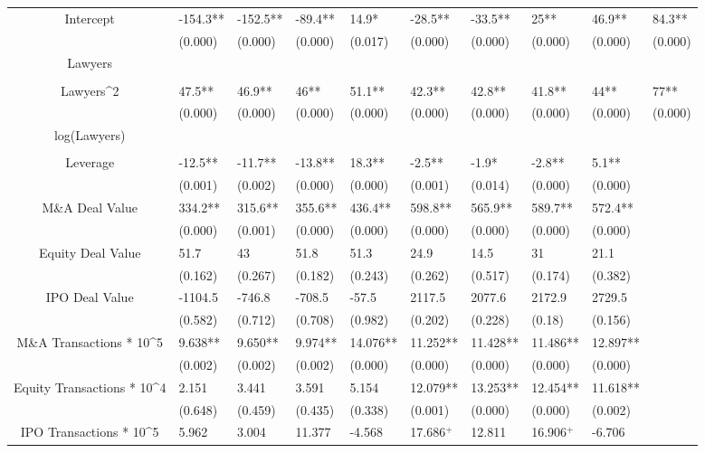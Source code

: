 \documentclass{article}
\begin{document}
\begin{table}[H]
\begin{tabular}{|clllllllll|}
Intercept & -154.3** & -152.5** & -89.4** & 14.9* & -28.5** & -33.5** & 25** & 46.9** & 84.3** \\ 
   & (0.000) & (0.000) & (0.000) & (0.017) & (0.000) & (0.000) & (0.000) & (0.000) & (0.000) \\ 
  Lawyers &  &  &  &  &  &  &  &  &  \\ 
   &  &  &  &  &  &  &  &  &  \\ 
  Lawyers^2 & 47.5** & 46.9** & 46** & 51.1** & 42.3** & 42.8** & 41.8** & 44** & 77** \\ 
   & (0.000) & (0.000) & (0.000) & (0.000) & (0.000) & (0.000) & (0.000) & (0.000) & (0.000) \\ 
  log(Lawyers) &  &  &  &  &  &  &  &  &  \\ 
   &  &  &  &  &  &  &  &  &  \\ 
  Leverage & -12.5** & -11.7** & -13.8** & 18.3** & -2.5** & -1.9* & -2.8** & 5.1** &  \\ 
   & (0.001) & (0.002) & (0.000) & (0.000) & (0.001) & (0.014) & (0.000) & (0.000) &  \\ 
  M\&A Deal Value & 334.2** & 315.6** & 355.6** & 436.4** & 598.8** & 565.9** & 589.7** & 572.4** &  \\ 
   & (0.000) & (0.001) & (0.000) & (0.000) & (0.000) & (0.000) & (0.000) & (0.000) &  \\ 
  Equity Deal Value & 51.7 & 43 & 51.8 & 51.3 & 24.9 & 14.5 & 31 & 21.1 &  \\ 
   & (0.162) & (0.267) & (0.182) & (0.243) & (0.262) & (0.517) & (0.174) & (0.382) &  \\ 
  IPO Deal Value & -1104.5 & -746.8 & -708.5 & -57.5 & 2117.5 & 2077.6 & 2172.9 & 2729.5 &  \\ 
   & (0.582) & (0.712) & (0.708) & (0.982) & (0.202) & (0.228) & (0.18) & (0.156) &  \\ 
  M\&A Transactions * 10^5 & 9.638** & 9.650** & 9.974** & 14.076** & 11.252** & 11.428** & 11.486** & 12.897** &  \\ 
   & (0.002) & (0.002) & (0.002) & (0.000) & (0.000) & (0.000) & (0.000) & (0.000) &  \\ 
  Equity Transactions * 10^4 & 2.151 & 3.441 & 3.591 & 5.154 & 12.079** & 13.253** & 12.454** & 11.618** &  \\ 
   & (0.648) & (0.459) & (0.435) & (0.338) & (0.001) & (0.000) & (0.000) & (0.002) &  \\ 
  IPO Transactions * 10^5 & 5.962 & 3.004 & 11.377 & -4.568 & 17.686$^{+}$ & 12.811 & 16.906$^{+}$ & -6.706 &  \\ 

\end{tabular}
\end{table}
\end{document}
